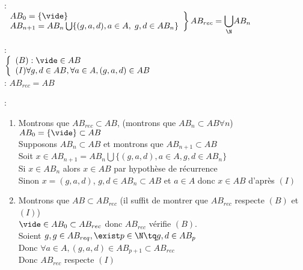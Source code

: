  : \\
$\left. \begin{array}{l}
	AB_0 =\{\vide\} \\
  AB_{n+1} = AB_n\bigcup \{(g,a,d),a\in A,\;g,d\in AB_n\}
	\end{array}\right\}
AB_{rec}=\displaystyle{\bigcup_{\N}} AB_n$

 : \\
$\left\{ \begin{array}{l}
	(B) : \vide \in AB \\
	(I) \forall g,d \in AB, \forall a \in A, (g,a,d)\in AB 
\end{array}
\right.$\\

 : $AB_{rec} = AB$

 : \begin{enumerate}
\item Montrons que $AB_{rec} \subset AB$, (montrons que $AB_n\subset AB \forall n$) \\
	$AB_0 = \{\vide\} \subset AB$\\
	Supposons $AB_n \subset AB$ et montrons que $AB_{n+1}\subset AB$ \\
	Soit $x\in AB_{n+1} = AB_n\bigcup \{ (g,a,d), a\in A, g,d \in AB_n \}$ \\
	Si $x\in AB_n$ alors $x\in AB$ par hypothèse de récurrence \\
	Sinon $x=(g,a,d)$, $g,d \in AB_n\subset AB$ et $a\in A$ donc $x\in AB$ d'après $(I)$
\item Montrons que $AB\subset AB_{rec}$ (il suffit de montrer que $AB_{rec}$ respecte $(B)$ et $(I)$) \\
	$\vide\in AB_0 \subset AB_{rec}$ donc $AB_{rec}$ vérifie $(B)$.\\
	Soient $g,g\in AB_{req}, \exist p \in \N \tq g,d\in AB_p$ \\
	Donc $\forall a\in A, (g,a,d)\in AB_{p+1}\subset AB_{rec}$ \\
	Donc $AB_{rec}$ respecte $(I)$
\end{enumerate}
	

